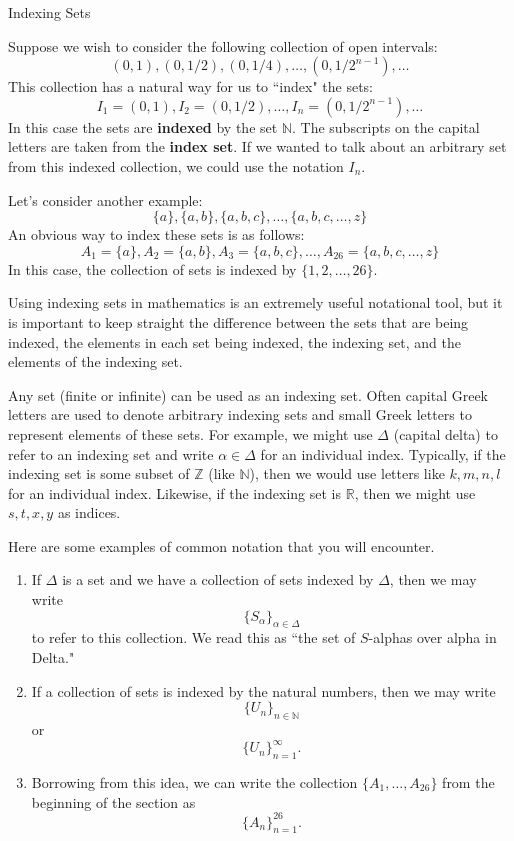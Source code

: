 \begin{section}{Indexing Sets}

Suppose we wish to consider the following collection of open intervals:
\[
(0,1), (0,1/2), (0,1/4), \ldots, (0,1/2^{n-1}), \ldots
\]
This collection has a natural way for us to ``index" the sets:
\[
I_1=(0,1), I_2=(0,1/2), \ldots, I_n=(0,1/2^{n-1}), \ldots
\]
In this case the sets are \textbf{indexed} by the set $\mathbb{N}$.  The subscripts on the capital letters are taken from the \textbf{index set}.  If we wanted to talk about an arbitrary set from this indexed collection, we could use the notation $I_n$.

Let's consider another example:
\[
\{a\}, \{a,b\}, \{a,b,c\}, \ldots, \{a,b,c,\ldots,z\}
\]
An obvious way to index these sets is as follows:
\[
A_1=\{a\}, A_2=\{a,b\}, A_3=\{a,b,c\}, \ldots, A_{26}=\{a,b,c,\ldots,z\}
\]
In this case, the collection of sets is indexed by $\{1,2,\ldots, 26\}$.

\begin{remark}
Using indexing sets in mathematics is an extremely useful notational tool, but it is important to keep straight the difference between the sets that are being indexed, the elements in each set being indexed, the indexing set, and the elements of the indexing set.
\end{remark}

Any set (finite or infinite) can be used as an indexing set.  Often capital Greek letters are used to denote arbitrary indexing sets and small Greek letters to represent elements of these sets.  For example, we might use $\Delta$ (capital delta) to refer to an indexing set and write $\alpha \in \Delta$ for an individual index.  Typically, if the indexing set is some subset of $\mathbb{Z}$ (like $\mathbb{N}$), then we would use letters like $k,m,n,l$ for an individual index.  Likewise, if the indexing set is $\mathbb{R}$, then we might use $s,t,x,y$ as indices.  

\begin{example}
Here are some examples of common notation that you will encounter.
\begin{enumerate}
\item If $\Delta$ is a set and we have a collection of sets indexed by $\Delta$, then we may write
\[
\{S_{\alpha}\}_{\alpha\in \Delta}
\]
to refer to this collection.  We read this as ``the set of $S$-alphas over alpha in Delta."
\item If a collection of sets is indexed by the natural numbers, then we may write
\[
\{U_n\}_{n\in\mathbb{N}}
\]
or
\[
\{U_n\}_{n=1}^{\infty}.
\]
\item Borrowing from this idea, we can write the collection $\{A_1,\ldots,A_{26}\}$ from the beginning of the section as
\[
\{A_n\}_{n=1}^{26}.
\]


\end{enumerate}
\end{example}
\end{section}
